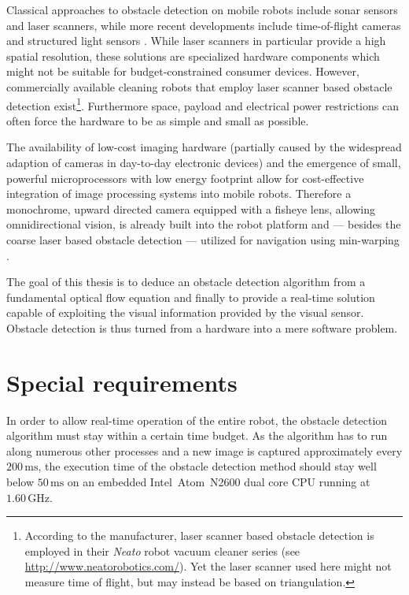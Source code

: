 Classical approaches to obstacle detection on mobile robots include sonar sensors and laser scanners, while more recent developments include time-of-flight cameras and structured light sensors \citep[chapter 4.1.9 ``Active ranging'', p. 125ff.]{AutonomousMobileRobots}. While laser scanners in particular provide a high spatial resolution, these solutions are specialized hardware components which might not be suitable for budget-constrained consumer devices. However, commercially available cleaning robots that employ laser scanner based obstacle detection exist\footnote{According to the manufacturer, laser scanner based obstacle detection is employed in their \textit{Neato} robot vacuum cleaner series (see \url{http://www.neatorobotics.com/}). Yet the laser scanner used here might not measure time of flight, but may instead be based on triangulation.}. Furthermore space, payload and electrical power restrictions can often force the hardware to be as simple and small as possible.

The availability of low-cost imaging hardware (partially caused by the widespread adaption of cameras in day-to-day electronic devices) and the emergence of small, powerful microprocessors with low energy footprint allow for cost-effective integration of image processing systems into mobile robots. Therefore a monochrome, upward directed camera equipped with a fisheye lens, allowing omnidirectional vision, is already built into the robot platform and --- besides the coarse laser based obstacle detection --- utilized for navigation using min-warping \citep{own_moeller10_1,own_hillen_13_1}.

The goal of this thesis is to deduce an obstacle detection algorithm from a fundamental optical flow equation and finally to provide a real-time solution capable of exploiting the visual information provided by the visual sensor. Obstacle detection is thus turned from a hardware into a mere software problem.

\section{Special requirements}

\label{sec:intro_special}

In order to allow real-time operation of the entire robot, the obstacle detection algorithm must stay within a certain time budget. As the algorithm has to run along numerous other processes and a new image is captured approximately every $200\,\mathrm{ms}$, the execution time of the obstacle detection method should stay well below $50\,\mathrm{ms}$ on an embedded Intel\textregistered\ Atom\texttrademark\ N2600 dual core CPU running at $1{.}60 \, \mathrm{GHz}$.

